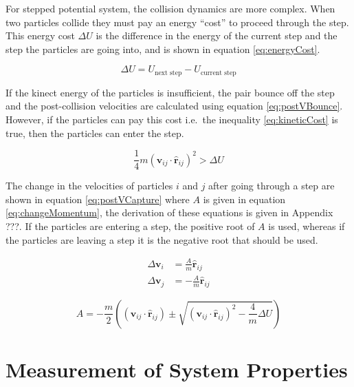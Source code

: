 \documentclass[12pt]{UoAthesis}
\begin{document}
For stepped potential system, the collision dynamics are more complex.
When two particles collide they must pay an energy ``cost'' to proceed
through the step.  This energy cost $\Delta U$ is the difference in
the energy of the current step and the step the particles are going
into, and is shown in equation \eqref{eq:energyCost}.

\begin{equation}
  \label{eq:energyCost}
  \Delta U = U_{\text{next step}} - U_{\text{current step}}
\end{equation}

If the kinect energy of the particles is insufficient, the pair bounce
off the step and the post-collision velocities are calculated using
equation \eqref{eq:postVBounce}. However, if the particles can pay
this cost i.e.\ the inequality \eqref{eq:kineticCost} is true, then the
particles can enter the step.

\begin{equation}
\label{eq:kineticCost}
  \frac{1}{4}m(\mathbf{v}_{ij}\cdot\mathbf{\hat{r}}_{ij})^2 > \Delta U
\end{equation}

The change in the velocities of particles $i$ and $j$ after going
through a step are shown in equation \eqref{eq:postVCapture} where $A$
is given in equation \eqref{eq:changeMomentum}, the derivation of
these equations is given in Appendix ???.  If the particles are
entering a step, the positive root of $A$ is used, whereas if the
particles are leaving a step it is the negative root that should be
used.

\begin{subequations}
  \label{eq:postVCapture}
  \begin{align}
    \Delta\mathbf{v}_i &= \frac{A}{m} \mathbf{\hat{r}}_{ij} \\
    \Delta\mathbf{v}_j &= -\frac{A}{m}\mathbf{\hat{r}}_{ij}
  \end{align}
\end{subequations}

\begin{equation}
  \label{eq:changeMomentum}
  A = -\frac{m}{2}\left((\mathbf{v}_{ij}\cdot\mathbf{\hat{r}}_{ij}) \pm
  \sqrt{(\mathbf{v}_{ij}\cdot\mathbf{\hat{r}}_{ij})^2 - \frac{4}{m}\Delta U}\right)
\end{equation}
\newpage
\section{Measurement of System Properties}
\end{document}
